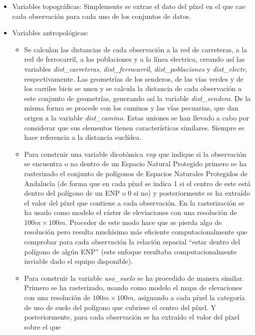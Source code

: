 \documentclass[12pt,a4paper,]{book}
\numberwithin{dummy}{section}
\theoremstyle{ocrenumbox}
\theoremstyle{blacknumex}
\theoremstyle{blacknumbox}
\theoremstyle{ocrenum}
\theoremstyle{ocrenum}
\begin{document}
\begin{itemize}
\item
  Variables topográficas: Simplemente se extrae el dato del píxel en el
  que cae cada observación para cada uno de los conjuntos de datos.
\item
  Variables antropológicas:

  \begin{itemize}
  \item
    Se calculan las distancias de cada observación a la red de
    carreteras, a la red de ferrocarril, a las poblaciones y a la línea
    electrica, creando así las variables \emph{dist\_carreteras},
    \emph{dist\_ferrocarril}, \emph{dist\_poblaciones} y
    \emph{dist\_electr}, respectivamente. Las geometrías de los
    senderos, de las vías verdes y de los carriles bicis se unen y se
    calcula la distancia de cada observación a este conjunto de
    geometrías, generando así la variable \emph{dist\_sendero}. De la
    misma forma se procede con los caminos y las vías pecuarias, que dan
    origen a la variable \emph{dist\_camino}. Estas uniones se han
    llevado a cabo por considerar que sus elementos tienen
    características similares. Siempre se hace referencia a la distancia
    euclídea.
  \item
    Para construir una variable dicotómica \emph{enp} que indique si la
    observación se encuentra o no dentro de un Espacio Natural Protegido
    primero se ha rasterizado el conjunto de polígonos de Espacios
    Naturales Protegidos de Andalucía (de forma que en cada píxel se
    indica 1 si el centro de este está dentro del polígono de un ENP o 0
    si no) y posteriormente se ha extraído el valor del píxel que
    contiene a cada observación. En la rasterización se ha usado como
    modelo el ráster de eleviaciones con una resolución de
    \(100m \times 100m\). Proceder de este modo hace que se pierda algo
    de resolución pero resulta muchísimo más eficiente
    computacionalmente que comprobar para cada observación la relación
    espacial ``estar dentro del polígono de algún ENP'' (este enfoque
    resultaba computacionalmente inviable dado el equipo disponible).
  \item
    Para construir la variable \emph{uso\_suelo} se ha procedido de
    manera similar. Primero se ha rasterizado, usando como modelo el
    mapa de elevaciones con una resolución de \(100m \times 100m\),
    asignando a cada píxel la categoría de uso de suelo del polígono que
    cubriese el centro del píxel. Y posteriormente, para cada
    observación se ha extraído el valor del píxel sobre el que

\end{itemize}
\end{itemize}
\end{document}
